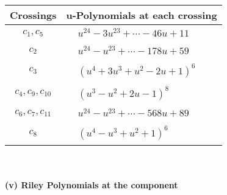 \documentclass[1p]{elsarticle_modified}
\theoremstyle{definition}
\begin{document}
\begin{tabular}{m{50pt}|m{274pt}}
Crossings & \hspace{64pt}u-Polynomials at each crossing \\
\hline $$\begin{aligned}c_{1},c_{5}\end{aligned}$$&$\begin{aligned}
&u^{24}-3 u^{23}+\cdots-46 u+11
\end{aligned}$\\
\hline $$\begin{aligned}c_{2}\end{aligned}$$&$\begin{aligned}
&u^{24}- u^{23}+\cdots-178 u+59
\end{aligned}$\\
\hline $$\begin{aligned}c_{3}\end{aligned}$$&$\begin{aligned}
&(u^4+3 u^3+u^2-2 u+1)^6
\end{aligned}$\\
\hline $$\begin{aligned}c_{4},c_{9},c_{10}\end{aligned}$$&$\begin{aligned}
&(u^3- u^2+2 u-1)^8
\end{aligned}$\\
\hline $$\begin{aligned}c_{6},c_{7},c_{11}\end{aligned}$$&$\begin{aligned}
&u^{24}- u^{23}+\cdots-568 u+89
\end{aligned}$\\
\hline $$\begin{aligned}c_{8}\end{aligned}$$&$\begin{aligned}
&(u^4- u^3+u^2+1)^6
\end{aligned}$\\
\hline
\end{tabular}\\~\\
\newpage\renewcommand{\arraystretch}{1}
\flushleft \textbf{(v) Riley Polynomials at the component}\newline \\
\end{document}
